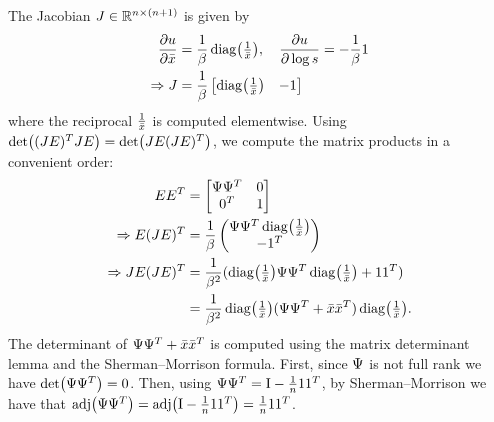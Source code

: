 The Jacobian $J \in \mathbb{R}^{n \times (n+1)}$ is given by
\begin{align}
    \frac{\partial \vv{u}}{\partial \vv{\bar{x}}} & = \frac{1}{\beta} \Diag{ \tfrac{1}{\vv{\bar{x}}} }, \quad \frac{\partial \vv{u}}{\partial \log s} = -\frac{1}{\beta} \One \\
    \Rightarrow
    \vv{J}                                        & = \frac{1}{\beta}
    \begin{bmatrix}
        \Diag{ \tfrac{1}{\vv{\bar{x}}} } & -\One
    \end{bmatrix}
\end{align}
where the reciprocal $\frac{1}{\bar{x}}$ is computed elementwise.
Using $\Det{ (\vv{J} \vv{E})^T \vv{J} \vv{E} } = \Det{ \vv{J} \vv{E} (\vv{J} \vv{E})^T}$, we compute the matrix products in a convenient order:
\begin{align}
    \begin{split}
        \vv{E} \vv{E}^T                             & = \begin{bmatrix}
            \vv{\Psi} \vv{\Psi}^T & \Zero \\
            \Zero^T               & 1
        \end{bmatrix}                                                                                                                \\
        \Rightarrow \vv{E} (\vv{J} \vv{E})^T        & = \frac{1}{\beta} \begin{pmatrix}
            \vv{\Psi} \vv{\Psi}^T \Diag{ \tfrac{1}{\vv{\bar{x}}} } \\
            -\One^T
        \end{pmatrix}                                                                       \\
        \Rightarrow \vv{J} \vv{E} (\vv{J} \vv{E})^T & = \frac{1}{\beta^2} ( \Diag{ \tfrac{1}{\vv{\bar{x}}} } \vv{\Psi} \vv{\Psi}^T \Diag{ \tfrac{1}{\vv{\bar{x}}} } + \One \One^T )                  \\
        & = \frac{1}{\beta^2} \Diag{ \tfrac{1}{\vv{\bar{x}}} } ( \vv{\Psi} \vv{\Psi}^T + \vv{\bar{x}} \vv{\bar{x}}^T ) \Diag{ \tfrac{1}{\vv{\bar{x}}} }.
    \end{split}
\end{align}
The determinant of $\Psi \Psi^T + \bar{x} \bar{x}^T$ is computed using the matrix determinant lemma and the Sherman--Morrison formula.
First, since $\Psi$ is not full rank we have $\Det{ \vv{\Psi} \vv{\Psi}^T } = 0$.
Then, using $\Psi \Psi^T = \mathrm{I} - \frac{1}{n} \mathrm{1} \mathrm{1}^T$, by Sherman--Morrison we have that $\Adj{ \vv{\Psi} \vv{\Psi}^T } = \Adj{ \Id - \frac{1}{n} \One \One^T } = \frac{1}{n} \One \One^T$.
